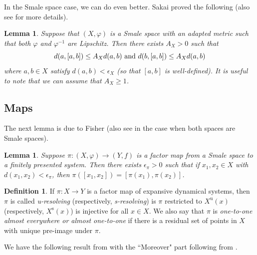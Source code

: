 \documentclass{amsart}
\theoremstyle{plain}
\newtheorem{lemma}[theorem]{Lemma}
\theoremstyle{definition}
\newtheorem{definition}[theorem]{Definition}
\theoremstyle{remark}
\begin{document}
In the Smale space case, we can do even better. Sakai \cite{sakai01} proved the following (also see \cite[Lemma 4.10]{Ger2022} for more details).
\begin{lemma} \label{lem:AXconstant}
Suppose that $(X, \varphi)$ is a Smale space with an adapted metric such that both $\varphi$ and $\varphi^{-1}$ are Lipschitz. Then there exists $A_X>0$ such that 
\[
d(a, [a, b])\leq A_Xd(a,b) \hbox{ and }d(b, [a, b])\leq A_Xd(a,b)
\]
where $a, b \in X$ satisfy $d(a, b)< \epsilon_X$ (so that $[a, b]$ is well-defined). It is useful to note that we can assume that $A_X \ge 1$.
\end{lemma}




\subsection{Maps} \label{SecMaps}
The next lemma is due to Fisher \cite[Lemma 3.3]{fisher13} (also see \cite[Lemma 2.2]{PutLift} in the case when both spaces are Smale spaces).
\begin{lemma} \label{lem:EpsPi}
Suppose $\pi: (X, \varphi) \rightarrow (Y, f)$ is a factor map from a Smale space to a finitely presented system. Then there exists $\epsilon_{\pi}>0$ such that if $x_1, x_2 \in X$ with $d(x_1, x_2)< \epsilon_{\pi}$, then $\pi([x_1, x_2])=[\pi(x_1), \pi(x_2)]$.
\end{lemma}


\begin{definition} \label{def:Ures}
If $\pi:X \to Y$ is a factor map of expansive dynamical systems, then $\pi$ is called \emph{u-resolving} (respectively, \emph{s-resolving}) is $\pi$ restricted to $X^\text{u}(x)$ (respectively, $X^\text{s}(x)$) is injective for all $x \in X$.  We also say that $\pi$ is \emph{one-to-one almost everywhere or almost one-to-one} if there is a residual set of points in $X$ with unique pre-image under $\pi$.  
\end{definition}

We have the following result from \cite{fisher13} with the ``Moreover" part following from \cite[Lemma 6.6]{DeeSto}.   
\end{document}
